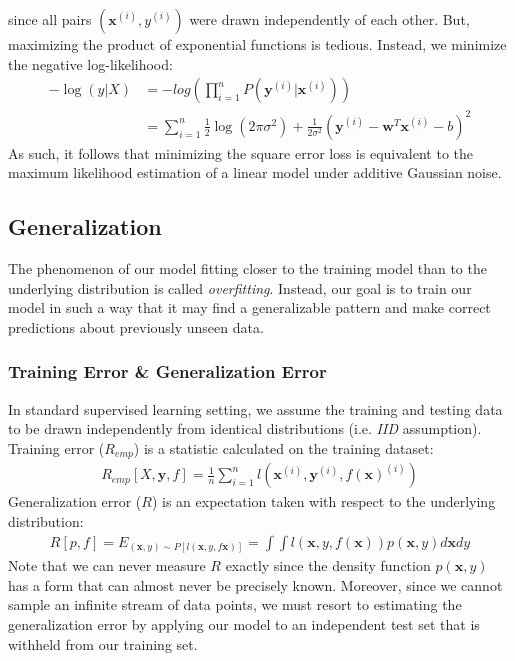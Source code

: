 \documentclass[a4paper,12pt]{article}
\theoremstyle{definition}
\begin{document}
    since all pairs $(\mathbf{x}^{(i)},y^{(i)})$ were drawn independently of each other. But, maximizing the product of exponential
    functions is tedious. Instead, we minimize the negative log-likelihood:
    \begin{equation*}
        \begin{aligned}
            -\log(y|X) &= -log(\prod_{i=1}^{n}P(\mathbf{y}^{(i)}|\mathbf{x}^{(i)})) \\
                       &= \sum_{i=1}^{n} \frac{1}{2}\log(2\pi\sigma^2) + \frac{1}{2\sigma^2}(\mathbf{y}^{(i)}-\mathbf{w}^T\mathbf{x}^{(i)} - b)^2
        \end{aligned}
    \end{equation*}
    As such, it follows that minimizing the square error loss is equivalent to the maximum likelihood estimation of a linear model 
    under additive Gaussian noise.

\subsection*{Generalization}
    The phenomenon of our model fitting closer to the training model than to the underlying distribution is called \textit{overfitting}.
    Instead, our goal is to train our model in such a way that it may find a generalizable pattern and make correct
    predictions about previously unseen data.
    \subsubsection*{Training Error \& Generalization Error}
    In standard supervised learning setting, we assume the training and testing data to be drawn independently from
    identical distributions (i.e. \textit{IID} assumption).
    Training error ($R_{emp}$) is a statistic calculated on the training dataset:
    \begin{equation*}
        \begin{aligned}
           R_{emp}[X,\mathbf{y},f] = \frac{1}{n}\sum_{i=1}^{n}l(\mathbf{x}^{(i)},\mathbf{y}^{(i)},f(\mathbf{x})^{(i)})
        \end{aligned}
    \end{equation*}
    Generalization error ($R$) is an expectation taken with respect to the underlying distribution:
    \begin{equation*}
        \begin{aligned}
           R[p,f] = E_{(\mathbf{x},y)\sim P[l(\mathbf{x},y,f{\mathbf{x}})]} = \int\int l(\mathbf{x},y,f(\mathbf{x}))p(\mathbf{x},y)d\mathbf{x}dy
         \end{aligned}
    \end{equation*}
    Note that we can never measure $R$ exactly since the density function $p(\mathbf{x},y)$ has a form that can almost never
    be precisely known. Moreover, since we cannot sample an infinite stream of data points, we must resort to estimating
    the generalization error by applying our model to an independent test set that is withheld from our training set.
\end{document}
